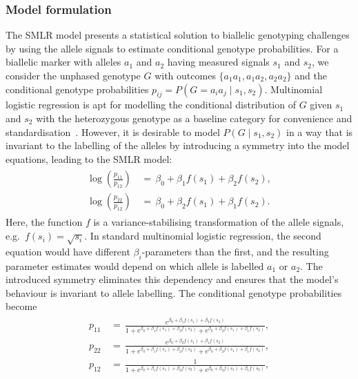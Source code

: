 \documentclass[preprint,5p,times,11pt]{elsarticle}
\begin{document}
\subsubsection{Model formulation}
The SMLR model presents a statistical solution to biallelic genotyping challenges by using the allele signals to estimate conditional genotype probabilities.
For a biallelic marker with alleles $a_1$ and $a_2$ having measured signals $s_1$ and $s_2$, we consider the unphased genotype $G$ with outcomes $\lbrace a_1a_1, a_1a_2, a_2a_2\rbrace$ and the conditional genotype probabilities $p_{ij} = P\left(G = a_i a_j \mid s_1, s_2 \right)$.
Multinomial logistic regression is apt for modelling the conditional distribution of $G$ given $s_1$ and $s_2$ with the heterozygous genotype as a baseline category for convenience and standardisation~\cite[p.~293]{agresti}.
However, it is desirable to model $P\left(G \mid s_1, s_2\right)$ in a way that is invariant to the labelling of the alleles by introducing a symmetry into the model equations, leading to the SMLR model:
\begin{align}\label{eq:smlr}
\begin{split}
\log\left(\frac{p_{11}}{p_{12}}\right) \, &= \, \beta_0 + \beta_1 f\left(s_1\right) + \beta_2 f\left(s_2\right), \\
\log\left(\frac{p_{22}}{p_{12}}\right) \, &= \, \beta_0 + \beta_2 f\left(s_1\right) + \beta_1 f\left(s_2\right).
\end{split}
\end{align}
Here, the function $f$ is a variance-stabilising transformation of the allele signals, e.g.~$f(s_i) = \sqrt{s_i}$.
In standard multinomial logistic regression, the second equation would have different $\beta_i$-parameters than the first, and the resulting parameter estimates would depend on which allele is labelled $a_1$ or $a_2$.
The introduced symmetry eliminates this dependency and ensures that the model's behaviour is invariant to allele labelling.
The conditional genotype probabilities become
\begin{align}\label{eq:posterior}
\begin{split}
p_{11} \, &= \, \frac{e^{\beta_0 + \beta_1 f\left(s_1\right) + \beta_2 f\left(s_2\right) }}{1 + e^{\beta_0 + \beta_1 f\left(s_1\right) + \beta_2 f\left(s_2\right)} + e^{\beta_0 + \beta_2 f\left(s_1\right) + \beta_1 f\left(s_2\right)}}, \\
p_{22} \, &= \, \frac{e^{\beta_0 + \beta_2 f\left(s_1\right) + \beta_1 f\left(s_2\right) }}{1 + e^{\beta_0 + \beta_1 f\left(s_1\right) + \beta_2 f\left(s_2\right)} + e^{\beta_0 + \beta_2 f\left(s_1\right) + \beta_1 f\left(s_2\right)}}, \\
p_{12} \, &= \, \frac{1}{1 + e^{\beta_0 + \beta_1 f\left(s_1\right) + \beta_2 f\left(s_2\right)} + e^{\beta_0 + \beta_2 f\left(s_1\right) + \beta_1 f\left(s_2\right)}},
\end{split}
\end{align}
\end{document}
